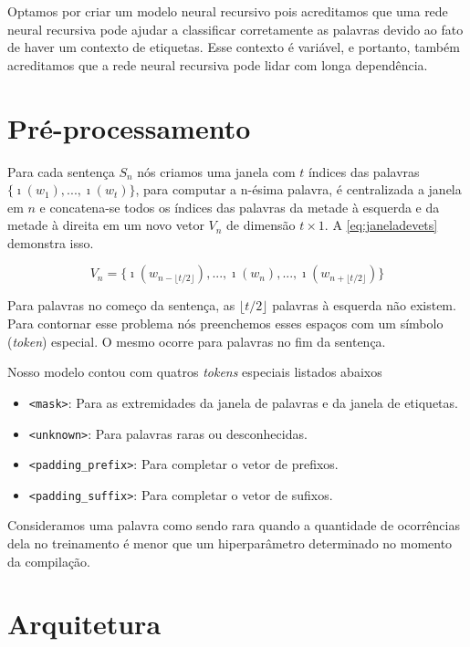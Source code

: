Optamos por criar um modelo neural recursivo pois acreditamos que uma rede neural recursiva pode ajudar a classificar corretamente as palavras devido ao fato de haver um contexto de etiquetas. Esse contexto é variável, e portanto, também acreditamos que a rede neural recursiva pode lidar com longa dependência.


\section{Pré-processamento}

Para cada sentença $S_n$ nós criamos uma janela com $t$ índices das palavras $\{\imath(w_1), ..., \imath(w_t)\}$, para computar a n-ésima palavra, é centralizada a janela em $n$ e concatena-se todos os índices das palavras da metade à esquerda e da metade à direita em um novo vetor $V_n$ de dimensão $t \times 1$. A \autoref{eq:janeladevets} demonstra isso.

\begin{equation} \label{eq:janeladevets}
V_n = \big\{ \imath(w_{n - \lfloor t/2 \rfloor}), ..., \imath(w_n), ..., \imath(w_{n + \lfloor t/2 \rfloor}) \big\}
\end{equation}

Para palavras no começo da sentença, as $\lfloor t/2 \rfloor$ palavras à esquerda não existem. Para contornar esse problema nós preenchemos esses espaços com um símbolo (\textit{token}) especial. O mesmo ocorre para palavras no fim da sentença. 

Nosso modelo contou com quatros \textit{tokens} especiais listados abaixos

\begin{itemize}
\item \texttt{<mask>}: Para as extremidades da janela de palavras e da janela de etiquetas.
\item \texttt{<unknown>}: Para palavras raras ou desconhecidas.
\item \texttt{<padding\_prefix>}: Para completar o vetor de prefixos.
\item \texttt{<padding\_suffix>}: Para completar o vetor de sufixos.
\end{itemize}

Consideramos uma palavra como sendo rara quando a quantidade de ocorrências dela no treinamento é menor que um hiperparâmetro determinado no momento da compilação.


\section{Arquitetura} \label{sec:arquiteturarecursiva}

